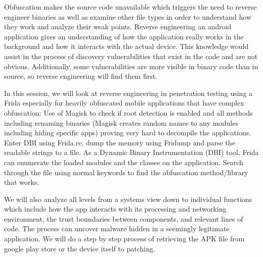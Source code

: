 \def\abstracttitle{Beating a Heavily Obfuscated App}
\def\abstractcomment{Regular Talk}
\def\abstractowner{Laura Tich and Evelyn Kilel}

\thispagestyle{abstract}

Obfuscation makes the source code unavailable which triggers the need to reverse engineer binaries as well as examine other file types in order to understand how they work and analyze their weak points. Reverse engineering an android application gives an understanding of how the application really works in the background and how it interacts with the actual device. This knowledge would assist in the process of discovery vulnerabilities that exist in the code and are not obvious. Additionally, some vulnerabilities are more visible in binary code than in source, so reverse engineering will find them first.

In this session, we will look at reverse engineering in penetration testing using a Frida especially for heavily obfuscated mobile applications that have complex obfuscation:
Use of Magisk to check if root detection is enabled and all methods including renaming binaries (Magisk creates random names to any modules including hiding specific apps) proving very hard to decompile the applications.
Enter DBI  using Frida.re, dump the memory using Fridump and parse the readable strings to a file. As a Dynamic Binary Instrumentation (DBI) tool, Frida can enumerate the loaded modules and the classes on the application.
Search through the file using normal keywords to find the obfuscation method/library that works.

We will also analyze all levels from a systems view down to individual functions which include how the app interacts with its processing and networking environment, the trust boundaries between components, and relevant lines of code. The process can uncover malware hidden in a seemingly legitimate application. We will do a step by step process of retrieving the APK file from google play store or the device itself to patching.
